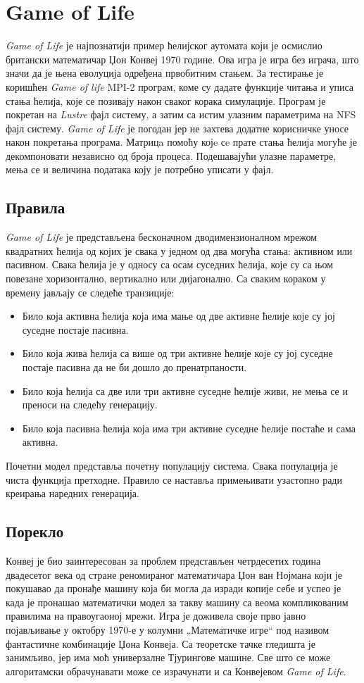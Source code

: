 \section{Game of Life}
\textit{Game of Life} је најпознатији пример ћелијског аутомата који је осмислио британски математичар Џон Конвеј 1970 године. Ова игра је игра без играча, што значи да је њена еволуција одређена првобитним стањем. 
За тестирање је коришћен \textit{Game of life} MPI-2 програм, коме су дадате функције читања и уписа стања ћелија, које се позивају након сваког корака симулације. Програм је покретан на \textit{Lustre} фајл систему, а затим са истим улазним параметрима на NFS фајл систему. \textit{Game of Life} је погодан јер не захтева додатне корисничке уносе након покретања програма. Матрицa помоћу којe сe прате стања ћелија могуће је декомпоновати независно од броја процеса. Подешавајући улазне параметре, мења се и величина података коју је потребно уписати у фајл.

\subsection{Правила}
\textit{Game of Life} је представљена бесконачном дводимензионалном мрежом квадратних ћелија од којих је свака у једном од два могућа стања: активном или пасивном. Свака ћелија је у односу са осам суседних ћелија, које су са њом повезане хоризонтално, вертикално или дијагонално. Са сваким кораком у времену јављају се следеће транзиције:

\begin{itemize}
\item Било која активна ћелија која има мање од две активне ћелије које су јој суседне постаје пасивна.
\item Било која жива ћелија са више од три активне ћелије које су јој суседне постаје пасивна да не би дошло до пренатрпаности.
\item Било која ћелија са две или три активне суседне ћелије живи, не мења се и преноси на следећу генерацију.
\item Било која пасивна ћелија која има три активне суседне ћелије постаће и сама активна.
\end{itemize}

Почетни модел представља почетну популацију система. Свака популација је чиста функција претходне. Правило се наставља примењивати узастопно ради креирања наредних генерација.

\subsection{Порекло}
Конвеј је био заинтересован за проблем представљен четрдесетих година двадесетог века од стране реномираног математичара Џон ван Нојмана који је покушавао да пронађе машину која би могла да изради копије себе и успео је када је пронашао математички модел за такву машину са веома компликованим правилима на правоугаоној мрежи. Игра је доживела своје прво јавно појављивање у октобру 1970-е у колумни „Математичке игре“ под називом фантастичне комбинације Џона Конвеја. Са теоретске тачке гледишта је занимљиво, јер има моћ универзалне Тјурингове машине. Све што се може алгоритамски обрачунавати може се израчунати и са Конвејевом \textit{Game of Life}.

